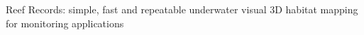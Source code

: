 Reef Records: simple, fast and repeatable underwater visual 3D habitat mapping for monitoring applications 